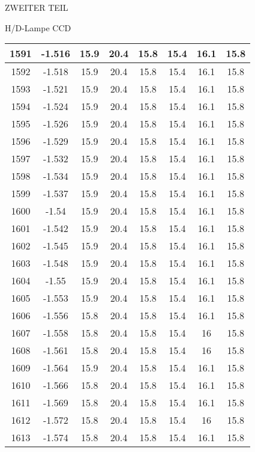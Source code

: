 \begin{appendix}
\begin{chapter}{ZWEITER TEIL}
\begin{section}{H/D-Lampe CCD}
\begin{scriptsize}
\begin{longtable}[htbp]{|c|c|c|c|c|c|c|c|}
            1591 & -1.516 & 15.9 & 20.4 & 15.8 & 15.4 & 16.1 & 15.8 \\ \hline
            1592 & -1.518 & 15.9 & 20.4 & 15.8 & 15.4 & 16.1 & 15.8 \\ \hline
            1593 & -1.521 & 15.9 & 20.4 & 15.8 & 15.4 & 16.1 & 15.8 \\ \hline
            1594 & -1.524 & 15.9 & 20.4 & 15.8 & 15.4 & 16.1 & 15.8 \\ \hline
            1595 & -1.526 & 15.9 & 20.4 & 15.8 & 15.4 & 16.1 & 15.8 \\ \hline
            1596 & -1.529 & 15.9 & 20.4 & 15.8 & 15.4 & 16.1 & 15.8 \\ \hline
            1597 & -1.532 & 15.9 & 20.4 & 15.8 & 15.4 & 16.1 & 15.8 \\ \hline
            1598 & -1.534 & 15.9 & 20.4 & 15.8 & 15.4 & 16.1 & 15.8 \\ \hline
            1599 & -1.537 & 15.9 & 20.4 & 15.8 & 15.4 & 16.1 & 15.8 \\ \hline
            1600 & -1.54 & 15.9 & 20.4 & 15.8 & 15.4 & 16.1 & 15.8 \\ \hline
            1601 & -1.542 & 15.9 & 20.4 & 15.8 & 15.4 & 16.1 & 15.8 \\ \hline
            1602 & -1.545 & 15.9 & 20.4 & 15.8 & 15.4 & 16.1 & 15.8 \\ \hline
            1603 & -1.548 & 15.9 & 20.4 & 15.8 & 15.4 & 16.1 & 15.8 \\ \hline
            1604 & -1.55 & 15.9 & 20.4 & 15.8 & 15.4 & 16.1 & 15.8 \\ \hline
            1605 & -1.553 & 15.9 & 20.4 & 15.8 & 15.4 & 16.1 & 15.8 \\ \hline
            1606 & -1.556 & 15.8 & 20.4 & 15.8 & 15.4 & 16.1 & 15.8 \\ \hline
            1607 & -1.558 & 15.8 & 20.4 & 15.8 & 15.4 & 16 & 15.8 \\ \hline
            1608 & -1.561 & 15.8 & 20.4 & 15.8 & 15.4 & 16 & 15.8 \\ \hline
            1609 & -1.564 & 15.9 & 20.4 & 15.8 & 15.4 & 16.1 & 15.8 \\ \hline
            1610 & -1.566 & 15.8 & 20.4 & 15.8 & 15.4 & 16.1 & 15.8 \\ \hline
            1611 & -1.569 & 15.8 & 20.4 & 15.8 & 15.4 & 16.1 & 15.8 \\ \hline
            1612 & -1.572 & 15.8 & 20.4 & 15.8 & 15.4 & 16 & 15.8 \\ \hline
            1613 & -1.574 & 15.8 & 20.4 & 15.8 & 15.4 & 16.1 & 15.8 \\ \hline

\end{longtable}
\end{scriptsize}
\end{section}
\end{chapter}
\end{appendix}
